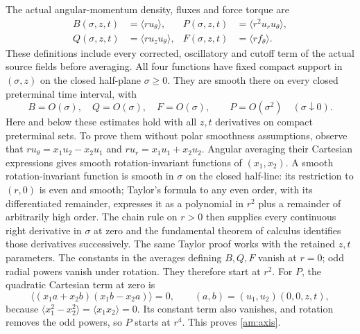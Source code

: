 The actual angular-momentum density, fluxes and force torque are
\begin{align*}
 B(\sigma,z,t)&=\langle r u_\theta\rangle,
 &P(\sigma,z,t)&=\langle r^2u_ru_\theta\rangle,\\
 Q(\sigma,z,t)&=\langle r u_zu_\theta\rangle,
 &F(\sigma,z,t)&=\langle r f_\theta\rangle.
\end{align*}
These definitions include every corrected, oscillatory and cutoff term
of the actual source fields before averaging. All four functions have
fixed compact support in $(\sigma,z)$ on the closed half-plane
$\sigma\geq0$. They are smooth there on every closed preterminal
time interval, with
\begin{equation}
 B=O(\sigma),\quad Q=O(\sigma),\quad F=O(\sigma),
 \qquad P=O(\sigma^2)\quad(\sigma\downarrow0).
 \label{am:axis}
\end{equation}
Here and below these estimates hold with all $z,t$ derivatives on
compact preterminal sets. To prove them without polar smoothness
assumptions, observe that $r u_\theta=x_1u_2-x_2u_1$ and
$r u_r=x_1u_1+x_2u_2$. Angular averaging their Cartesian expressions
gives smooth rotation-invariant functions of $(x_1,x_2)$.
A smooth rotation-invariant function is smooth in $\sigma$ on the
closed half-line: its restriction to $(r,0)$ is even and smooth;
Taylor's formula to any even order, with its differentiated remainder,
expresses it as a polynomial in $r^2$ plus a remainder of arbitrarily
high order. The chain rule on $r>0$ then supplies every continuous
right derivative in $\sigma$ at zero and the fundamental theorem of
calculus identifies those derivatives successively. The same Taylor
proof works with the retained $z,t$ parameters.
The constants in the averages defining $B,Q,F$ vanish at $r=0$;
odd radial powers vanish under rotation. They therefore start at
$r^2$. For $P$, the quadratic Cartesian term at zero is
\[
 \big\langle(x_1a+x_2b)(x_1b-x_2a)\big\rangle=0,
 \qquad (a,b)=(u_1,u_2)(0,0,z,t),
\]
because $\langle x_1^2-x_2^2\rangle=
\langle x_1x_2\rangle=0$. Its constant term also vanishes, and
rotation removes the odd powers, so $P$ starts at $r^4$.
This proves \eqref{am:axis}.

